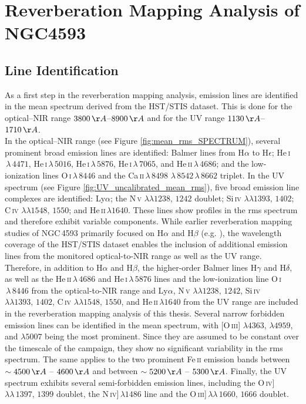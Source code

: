 \chapter{Reverberation Mapping Analysis of NGC4593}
\label{cap: Results}

\section{Line Identification}

As a first step in the reverberation mapping analysis, emission lines are identified in the mean spectrum derived from the HST/STIS dataset. This is done for the optical–NIR range $3800\,\AA$–$8900\,\AA$ and for the UV range $1130\,\AA$– $1710\,\AA$.\\ 
In the optical–NIR range (see Figure \ref{fig:mean_rms_SPECTRUM}), several prominent broad emission lines are identified: Balmer lines from H$\alpha$ to H$\epsilon$; He\,\textsc{i}$\,\lambda\,4471$, He\,\textsc{i}$\,\lambda\,5016$, He\,\textsc{i}$\,\lambda\,5876$, He\,\textsc{i}$\,\lambda\,7065$, and He\,\textsc{ii}$\,\lambda\,4686$; and the low-ionization lines O\,\textsc{i}$\,\lambda\,8446$ and the Ca\,\textsc{ii}$\,\lambda\,8498$ $\lambda\,8542$\,$\lambda\,8662$ triplet. In the UV spectrum (see Figure \ref{fig:UV_uncalibrated_mean_rms}), five broad emission line complexes are identified: Ly$\alpha$; the N\,\textsc{v} $\lambda\lambda1238,\,1242$ doublet; Si\,\textsc{iv} $\lambda\lambda1393,\,1402$; C\,\textsc{iv} $\lambda\lambda1548,\,1550$; and He\,\textsc{ii}$\,\lambda1640$. These lines show profiles in the rms spectrum and therefore exhibit variable components. While earlier reverberation mapping studies of NGC\,4593 primarily focused on H$\alpha$ and H$\beta$ (e.g. \cite{kollatschny1997balmer, denney2006ngc4593}), the wavelength coverage of the HST/STIS dataset enables the inclusion of additional emission lines from the monitored optical-to-NIR range as well as the UV range. Therefore, in addition to H$\alpha$ and H$\beta$, the higher-order Balmer lines H$\gamma$ and H$\delta$, as well as the He\,\textsc{ii}$\,\lambda\,4686$ and He\,\textsc{i}$\,\lambda\,5876$ lines and the low-ionization line O\,\textsc{i}$\,\lambda\,8446$ from the optical-to-NIR range and Ly$\alpha$, N\,\textsc{v} $\lambda\lambda1238,\,1242$, Si\,\textsc{iv} $\lambda\lambda1393,\,1402$, C\,\textsc{iv} $\lambda\lambda1548,\,1550$, and He\,\textsc{ii}$\,\lambda1640$ from the UV range are included in the reverberation mapping analysis of this thesis. Several narrow forbidden emission lines can be identified in the mean spectrum, with [O\,\textsc{iii}] $\lambda4363$, $\lambda4959$, and $\lambda5007$ being the most prominent. Since they are assumed to be constant over the timescale of the campaign, they show no significant variability in the rms spectrum. The same applies to the two prominent Fe\,\textsc{ii} emission bands between $\sim 4500\,\AA$ -- $4600\,\AA$ and between $\sim 5200\,\AA$ -- $5300\,\AA$. Finally, the UV spectrum exhibits several semi-forbidden emission lines, including the O\,\textsc{iv}]\,$\lambda\lambda\, 1397,\,1399$ doublet, the N\,\textsc{iv}]\,$\lambda1486$ line and the O\,\textsc{iii}]\,$\lambda\lambda\, 1660,\,1666$ doublet.
